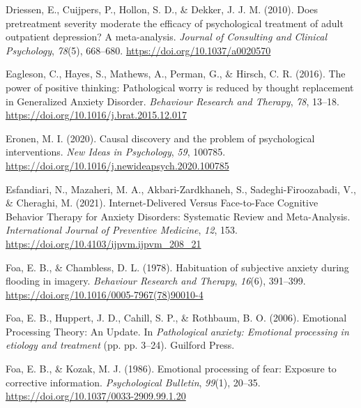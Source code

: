 \documentclass[
  man,floatsintext]{apa7}
\newlength{\cslhangindent}
\newlength{\cslentryspacingunit} %
\newenvironment{CSLReferences}[2] %
 {%
  \setlength{\parindent}{0pt}
  \ifodd #1
  \let\oldpar\par
  \def\par{\hangindent=\cslhangindent\oldpar}
  \fi
  \setlength{\parskip}{#2\cslentryspacingunit}
 }%
 {}
\begin{document}
\begin{CSLReferences}{1}{0}
\leavevmode{}%
Driessen, E., Cuijpers, P., Hollon, S. D., \& Dekker, J. J. M. (2010). Does pretreatment severity moderate the efficacy of psychological treatment of adult outpatient depression? A meta-analysis. \emph{Journal of Consulting and Clinical Psychology}, \emph{78}(5), 668--680. \url{https://doi.org/10.1037/a0020570}

\leavevmode{}%
Eagleson, C., Hayes, S., Mathews, A., Perman, G., \& Hirsch, C. R. (2016). The power of positive thinking: Pathological worry is reduced by thought replacement in Generalized Anxiety Disorder. \emph{Behaviour Research and Therapy}, \emph{78}, 13--18. \url{https://doi.org/10.1016/j.brat.2015.12.017}

\leavevmode{}%
Eronen, M. I. (2020). Causal discovery and the problem of psychological interventions. \emph{New Ideas in Psychology}, \emph{59}, 100785. \url{https://doi.org/10.1016/j.newideapsych.2020.100785}

\leavevmode{}%
Esfandiari, N., Mazaheri, M. A., Akbari-Zardkhaneh, S., Sadeghi-Firoozabadi, V., \& Cheraghi, M. (2021). Internet-Delivered Versus Face-to-Face Cognitive Behavior Therapy for Anxiety Disorders: Systematic Review and Meta-Analysis. \emph{International Journal of Preventive Medicine}, \emph{12}, 153. \url{https://doi.org/10.4103/ijpvm.ijpvm_208_21}

\leavevmode{}%
Foa, E. B., \& Chambless, D. L. (1978). Habituation of subjective anxiety during flooding in imagery. \emph{Behaviour Research and Therapy}, \emph{16}(6), 391--399. \url{https://doi.org/10.1016/0005-7967(78)90010-4}

\leavevmode{}%
Foa, E. B., Huppert, J. D., Cahill, S. P., \& Rothbaum, B. O. (2006). Emotional Processing Theory: An Update. In \emph{Pathological anxiety: Emotional processing in etiology and treatment} (pp. pp. 3--24). Guilford Press.

\leavevmode{}%
Foa, E. B., \& Kozak, M. J. (1986). Emotional processing of fear: Exposure to corrective information. \emph{Psychological Bulletin}, \emph{99}(1), 20--35. \url{https://doi.org/10.1037/0033-2909.99.1.20}


\end{CSLReferences}
\end{document}
